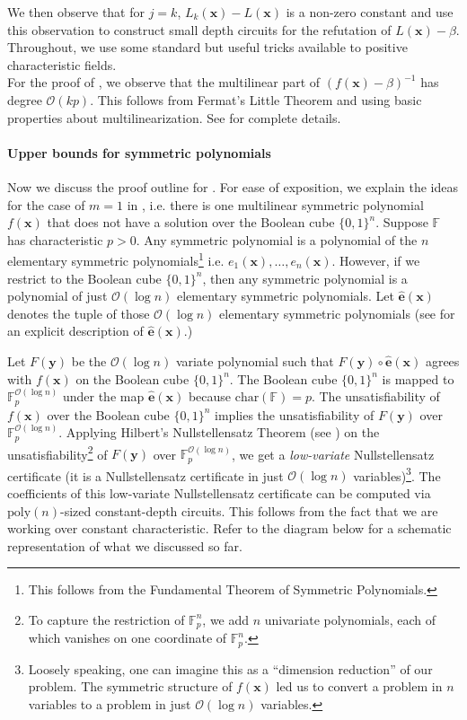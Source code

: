 \documentclass[11pt]{article}
\newcommand{\Boo}{\{0,1 \}}
\newcommand{\bigO}{\mathcal{O}}
\newcommand{\F}{\mathbb{F}}
\newcommand{\xbar}{\mathbf{x}}
\begin{document}
We then observe that for $j =k$, $L_k(\xbar) - L(\xbar)$ is a non-zero constant and use this observation to construct small depth circuits for the refutation of $L(\xbar) - \beta$. Throughout, we use some standard but useful tricks available to positive characteristic fields.\\

For the proof of , we observe that the multilinear part of $(f(\mathbf{x})-\beta)^{-1}$ has degree $\bigO(kp)$. This follows from Fermat's Little Theorem and using basic properties about multilinearization. See  for complete details.

\paragraph{Upper bounds for symmetric polynomials}
Now we discuss the proof outline for . For ease of exposition, we explain the ideas for the case of $m = 1$ in , i.e. there is one multilinear symmetric polynomial $f(\mathbf{x})$ that does not have a solution over the Boolean cube $\Boo^{n}$. Suppose $\F$ has characteristic $p > 0$. Any symmetric polynomial is a polynomial of the $n$ elementary symmetric polynomials\footnote{This follows from the Fundamental Theorem of Symmetric Polynomials.} i.e. $e_{1}(\mathbf{x}), \ldots, e_{n}(\mathbf{x})$. However, if we restrict to the Boolean cube $\Boo^{n}$, then any symmetric polynomial is a polynomial of just $\bigO(\log n)$ elementary symmetric polynomials. Let $\widehat{\mathbf{e}}(\mathbf{x})$ denotes the tuple of those $\bigO(\log n)$ elementary symmetric polynomials (see  for an explicit description of $\widehat{\mathbf{e}}(\mathbf{x})$.)

Let $F(\mathbf{y})$ be the $\bigO(\log n)$ variate polynomial such that $F(\mathbf{y}) \circ \widehat{\mathbf{e}}(\mathbf{x})$ agrees with $f(\mathbf{x})$ on the Boolean cube $\Boo^{n}$. The Boolean cube $\Boo^{n}$ is mapped to $\F_{p}^{\bigO(\log n)}$ under the map $\widehat{\mathbf{e}}(\mathbf{x})$ because $\mathrm{char}(\F) = p$. The unsatisfiability of $f(\mathbf{x})$ over the Boolean cube $\Boo^{n}$ implies the unsatisfiability of $F(\mathbf{y})$ over $\F_{p}^{\bigO(\log n)}$. Applying Hilbert's Nullstellensatz Theorem (see ) on the unsatisfiability\footnote{To capture the restriction of $\F_{p}^{n}$, we add $n$ univariate polynomials, each of which vanishes on one coordinate of $\F_{p}^{n}$.} of $F(\mathbf{y})$ over $\F_{p}^{\bigO(\log n)}$, we get a \emph{low-variate} Nullstellensatz certificate (it is a Nullstellensatz certificate in just $\bigO(\log n)$ variables)\footnote{Loosely speaking, one can imagine this as a ``dimension reduction'' of our problem. The symmetric structure of $f(\mathbf{x})$ led us to convert a problem in $n$ variables to a problem in just $\bigO(\log n)$ variables.}. The coefficients of this low-variate Nullstellensatz certificate can be computed via $\mathrm{poly}(n)$-sized constant-depth circuits. This follows from the fact that we are working over constant characteristic. Refer to the diagram below for a schematic representation of what we discussed so far.
\end{document}
